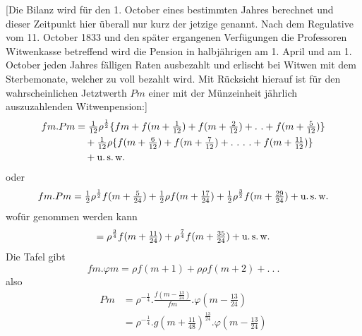 [Die Bilanz wird für den 1. October eines bestimmten Jahres berechnet und dieser Zeitpunkt hier überall nur kurz der jetzige genannt. Nach dem Regulative vom 11. October 1833 und den später ergangenen Verfügungen die Professoren Witwenkasse betreffend wird die Pension in halbjährigen am 1. April und am 1. October jeden Jahres fälligen Raten ausbezahlt und erlischt bei Witwen mit dem Sterbemonate, welcher zu voll bezahlt wird. Mit Rücksicht hierauf ist für den wahrscheinlichen Jetztwerth \(Pm\) einer mit der Münzeinheit jährlich auszuzahlenden Witwenpension:]
\[
\begin{aligned}
fm\mathord{.}Pm&=\tfrac{1}{12}\rho^{\frac{1}{2}}\{fm+f(m+\tfrac{1}{12})+f(m+\tfrac{2}{12})+.\ .+f(m+\tfrac{5}{12})\}\\
&\quad+\tfrac{1}{12}\rho\{f(m+\tfrac{6}{12})+f(m+\tfrac{7}{12})+.\ .\ .\ .+f(m+\tfrac{11}{12})\}\\
&\quad+\text{u.\,s.\,w.}
\end{aligned}
\]
\noindent oder
\[
fm\mathord{.}Pm=\tfrac{1}{2}\rho^{\frac{1}{2}}f(m+\tfrac{5}{24})+\tfrac{1}{2}\rho f(m+\tfrac{17}{24})+\tfrac{1}{2}\rho^{\frac{3}{2}}f(m+\tfrac{29}{24})+\text{u.\,s.\,w.}
\]
\noindent wofür genommen werden kann
\[
=\rho^{\frac{3}{4}}f(m+\tfrac{11}{24})+\rho^{\frac{7}{4}}f(m+\tfrac{35}{24})+\text{u.\,s.\,w.}
\]
\noindent Die Tafel gibt
\[
fm\mathord{.}\varphi m=\rho f(m+1)+\rho\rho f(m+2)+.\ .\ .
\]
\noindent also
\[
\begin{aligned}
Pm&=\rho^{-\frac{1}{4}}\mathord{.}\frac{f(m-\tfrac{13}{24})}{fm}\mathord{.}\varphi(m-\tfrac{13}{24})\\
&=\rho^{-\frac{1}{4}}\mathord{.}g(m+\tfrac{11}{48})^{\frac{13}{24}}\mathord{.}\varphi(m-\tfrac{13}{24})
\end{aligned}
\]
